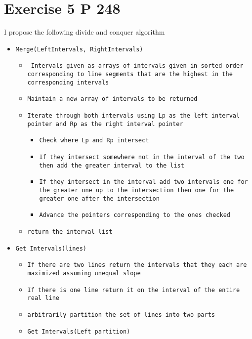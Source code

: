 \documentclass{amsart}
\begin{document}
\section{Exercise 5 P 248}
I propose the following divide and conquer algorithm
{\small
    \begin{itemize}
        \item \texttt{Merge(LeftIntervals, RightIntervals)}
            \begin{itemize}
                \item \texttt{ Intervals given as  arrays of intervals given in sorted order corresponding to line 
                    segments that are the highest in the corresponding intervals}
                \item \texttt{Maintain a new array of intervals to be returned}
                \item \texttt{Iterate through both intervals using Lp as the left interval pointer and Rp as the right interval pointer}
                    \begin{itemize}
                        \item \texttt{Check where Lp and Rp intersect}
                        \item \texttt{If they intersect somewhere not in the interval of the two then add the greater interval to the list}
                        \item \texttt{If they intersect in the interval add two intervals one for the greater one up to the intersection then one for the greater one after
                            the intersection}
                        \item \texttt{Advance the pointers corresponding to the ones checked}
                    \end{itemize}
                \item \texttt{return the interval list}
            \end{itemize}
        \item \texttt{Get Intervals(lines)}
            \begin{itemize}
                \item \texttt{If there are two lines return the intervals that they each are maximized assuming unequal slope}
                \item \texttt{If there is one line return it on the interval of the entire real line}
                \item \texttt{arbitrarily partition the set of lines into two parts}
                \item \texttt{Get Intervals(Left partition)}

\end{itemize}
\end{itemize}}
\end{document}
